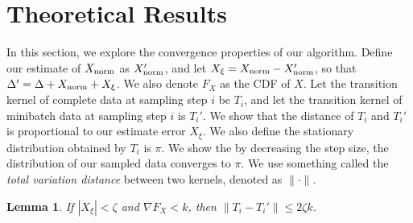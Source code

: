 \documentclass{article}
\newtheorem{lemma}{Lemma}
\begin{document}
\section{Theoretical Results}\label{sec:theory}

In this section, we explore the convergence properties of our algorithm.  Define our estimate of
$X_{\rm norm}$ as $X_{\rm norm}'$, and let $X_{\xi} = X_{\rm norm} - X_{\rm norm}'$, so that
$\Delta' = \Delta + X_{\rm norm} + X_\xi$.  We also denote $F_X$ as the CDF of $X$.  Let the
transition kernel of complete data at sampling step $i$ be $T_i$, and let the transition kernel of
minibatch data at sampling step $i$ is $T_i'$.  We show that the distance of $T_i$ and $T_i'$ is
proportional to our estimate error $X_{\xi}$. We also define the stationary distribution obtained
by $T_i$ is $\pi$.  We show the by decreasing the step size, the distribution of our sampled data
converges to $\pi$. We use something called the \emph{total variation distance} between two kernels,
denoted as $\| \cdot \|$.

\begin{lemma}
If $|X_\xi| < \zeta$ and $\nabla F_X < k$, then $\|T_i-T_i'\| \le 2\zeta k$.
\end{lemma}
\end{document}
